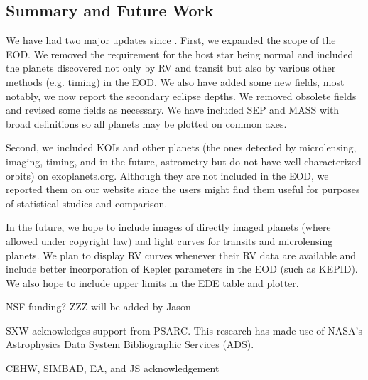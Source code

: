\documentclass[11pt,preprint]{aastex}
\begin{document}
\begin{CJK*}{UTF8}{gbsn}
\section{Summary and Future Work}\label{sec:summary}

We have had two major updates since \cite{Wright2011}. First, we
expanded the scope of the EOD. We removed the requirement for the host
star being normal and included the planets discovered not only by RV
and transit but also by various other methods (e.g. timing) in the
EOD. We also have added some new fields, most notably, we now report
the secondary eclipse depths. We removed obsolete fields and revised
some fields as necessary. We have included SEP and MASS with broad definitions so all planets may be plotted on common axes.

Second, we included KOIs and other planets (the ones detected by
microlensing, imaging, timing, and in the future, astrometry but do not have well characterized orbits) on
exoplanets.org. Although they are not included in the EOD, we reported
them on our website since the users might find them useful for
purposes of statistical studies and comparison.

In the future, we hope to include images of directly imaged planets
(where allowed under copyright law) and light curves for transits and microlensing planets. We plan to display RV curves whenever their RV data are available and include better incorporation of Kepler parameters in the EOD (such as KEPID). We also hope to include upper limits in the EDE table and plotter. 


\acknowledgments

NSF funding? ZZZ will be added by Jason

SXW acknowledges support from PSARC. This research has made use of
NASA's Astrophysics Data System Bibliographic Services (ADS). 

CEHW, SIMBAD, EA, and JS acknowledgement




\clearpage


\end{CJK*}
\end{document}
